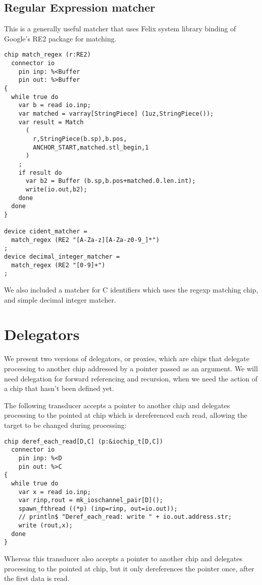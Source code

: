 \documentclass[oneside]{book}
\begin{document}
\subsection{Regular Expression matcher}
This is a generally useful matcher that uses
Felix system library binding of Google's RE2 package for matching. 

\begin{verbatim}
chip match_regex (r:RE2)
  connector io
    pin inp: %<Buffer
    pin out: %>Buffer
{
  while true do
    var b = read io.inp;
    var matched = varray[StringPiece] (1uz,StringPiece());
    var result = Match
      (
        r,StringPiece(b.sp),b.pos,
        ANCHOR_START,matched.stl_begin,1
      )
    ;
    if result do
      var b2 = Buffer (b.sp,b.pos+matched.0.len.int);
      write(io.out,b2);
    done
  done
}

device cident_matcher = 
  match_regex (RE2 "[A-Za-z][A-Za-z0-9_]*")
;
device decimal_integer_matcher = 
  match_regex (RE2 "[0-9]+")
;
\end{verbatim}

We also included a matcher for C identifiers which uses the regexp
matching chip, and simple decimal integer matcher.

\section{Delegators}
We present two versions of delegators, or proxies, which are chips that delegate
processing to another chip addressed by a pointer passed as an argument.
We will need delegation for forward referencing and recursion, when we need
the action of a chip that hasn't been defined yet.

The following transducer accepts a pointer to another chip and delegates
processing to the pointed at chip which is dereferenced each read,
allowing the target to be changed during processing:

\begin{verbatim}
chip deref_each_read[D,C] (p:&iochip_t[D,C]) 
  connector io
    pin inp: %<D
    pin out: %>C
{
  while true do
    var x = read io.inp;
    var rinp,rout = mk_ioschannel_pair[D]();
    spawn_fthread ((*p) (inp=rinp, out=io.out));
    // println$ "Deref_each_read: write " + io.out.address.str;
    write (rout,x);
  done
}
\end{verbatim}

Whereas this transducer also accepts a pointer to another chip
and delegates processing to the pointed at chip, but it only
dereferences the pointer once, after the first data is read.
\end{document}
